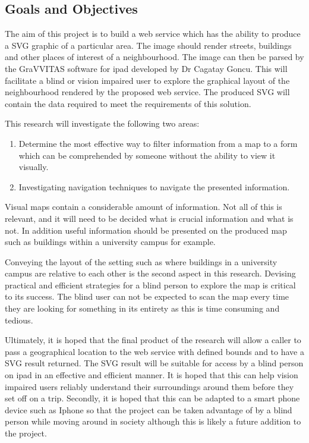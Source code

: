 \documentclass[11pt,twoside,a4paper]{article}
\begin{document}
\subsection{Goals and Objectives}
The aim of this project is to build a web service which has the ability
to produce a SVG graphic of a particular area. The image should render
streets, buildings and other places of interest of a neighbourhood. The
image can then be parsed by the GraVVITAS software for ipad developed by
Dr Cagatay Goncu. This will facilitate a blind or vision impaired user
to explore the graphical layout of the neighbourhood rendered by the
proposed web service. The produced SVG will contain the data required to
meet the requirements of this solution.

This research will investigate the following two areas:
\begin{enumerate}
\item Determine the most effective way to filter information from a map to a form which can be comprehended by someone without the ability to view it visually.
\item Investigating navigation techniques to navigate the presented information.
\end{enumerate}

Visual maps contain a considerable amount of information. Not all of
this is relevant, and it will need to be decided what is crucial
information and what is not. In addition useful information should be
presented on the produced map such as buildings within a university
campus for example.

Conveying the layout of the setting such as where buildings in a
university campus are relative to each other is the second aspect in
this research. Devising practical and efficient strategies for a blind
person to explore the map is critical to its success. The blind user can
not be expected to scan the map every time they are looking for
something in its entirety as this is time consuming and tedious.

Ultimately, it is hoped that the final product of the research will
allow a caller to pass a geographical location to the web service with
defined bounds and to have a SVG result returned. The SVG result will
be suitable for access by a blind person on ipad in an effective and
efficient manner. It is hoped that this can help vision impaired users
reliably understand their surroundings around them before they set off
on a trip. Secondly, it is hoped that this can be adapted to a smart
phone device such as Iphone so that the project can be taken advantage
of by a blind person while moving around in society although this is
likely a future addition to the project.
\end{document}
